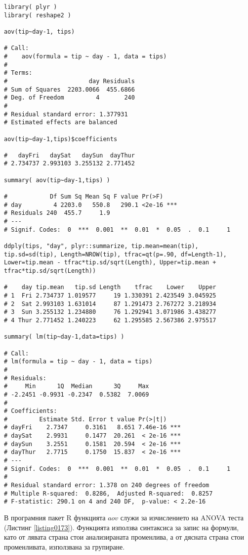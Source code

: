 \begin{lstlisting}[caption=ANOVA тест, label=listing0173]
library( plyr )
library( reshape2 )

aov(tip~day-1, tips)

# Call:
#    aov(formula = tip ~ day - 1, data = tips)
# 
# Terms:
#                       day Residuals
# Sum of Squares  2203.0066  455.6866
# Deg. of Freedom         4       240
# 
# Residual standard error: 1.377931
# Estimated effects are balanced

aov(tip~day-1,tips)$coefficients

#   dayFri   daySat   daySun  dayThur 
# 2.734737 2.993103 3.255132 2.771452 

summary( aov(tip~day-1,tips) )

#            Df Sum Sq Mean Sq F value Pr(>F)    
# day         4 2203.0   550.8   290.1 <2e-16 ***
# Residuals 240  455.7     1.9                   
# ---
# Signif. Codes:  0  ***  0.001  **  0.01  *  0.05  .  0.1     1

ddply(tips, "day", plyr::summarize, tip.mean=mean(tip), tip.sd=sd(tip), Length=NROW(tip), tfrac=qt(p=.90, df=Length-1), Lower=tip.mean - tfrac*tip.sd/sqrt(Length), Upper=tip.mean + tfrac*tip.sd/sqrt(Length))

#    day tip.mean   tip.sd Length    tfrac    Lower    Upper
# 1  Fri 2.734737 1.019577     19 1.330391 2.423549 3.045925
# 2  Sat 2.993103 1.631014     87 1.291473 2.767272 3.218934
# 3  Sun 3.255132 1.234880     76 1.292941 3.071986 3.438277
# 4 Thur 2.771452 1.240223     62 1.295585 2.567386 2.975517

summary( lm(tip~day-1,data=tips) )

# Call:
# lm(formula = tip ~ day - 1, data = tips)
# 
# Residuals:
#     Min      1Q  Median      3Q     Max 
# -2.2451 -0.9931 -0.2347  0.5382  7.0069 
# 
# Coefficients:
#         Estimate Std. Error t value Pr(>|t|)    
# dayFri    2.7347     0.3161   8.651 7.46e-16 ***
# daySat    2.9931     0.1477  20.261  < 2e-16 ***
# daySun    3.2551     0.1581  20.594  < 2e-16 ***
# dayThur   2.7715     0.1750  15.837  < 2e-16 ***
# ---
# Signif. Codes:  0  ***  0.001  **  0.01  *  0.05  .  0.1     1
# 
# Residual standard error: 1.378 on 240 degrees of freedom
# Multiple R-squared:  0.8286,	Adjusted R-squared:  0.8257 
# F-statistic: 290.1 on 4 and 240 DF,  p-value: < 2.2e-16
\end{lstlisting}

В програмния пакет R функцията $aov$ служи за изчислението на ANOVA теста (Листинг \ref{listing0173}). Функцията използва синтаксиса за запис на формули, като от лявата страна стои анализираната променлива, а от дясната страна стои променливата, използвана за групиране. 

